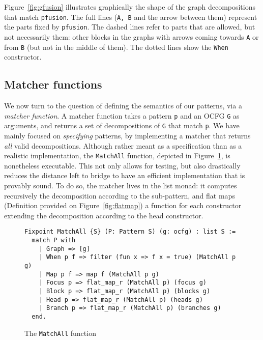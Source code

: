 \documentclass[11pt]{article}
\newcommand{\inlinecoq}[1]{\mbox{\lstinline[style=customcoq,columns=fixed,basewidth=.48em]{#1}}}
\newcommand{\ilc}[1]{\inlinecoq{#1}}
\newcommand{\yz}[1]{\textcolor{ForestGreen}{#1}}
\newcommand{\ocfg}{OCFG\xspace}
\begin{document}
Figure~\ref{fig:gfusion} illustrates graphically the shape of the graph decompositions that match \ilc{pfusion}. The full lines (\ilc{A, B} and the arrow between them) represent the parts fixed by \ilc{pfusion}. The dashed lines refer to parts that are allowed, but not necessarily them: other blocks in the graphs with arrows coming towards \ilc{A} or from \ilc{B} (but not in the middle of them). The dotted lines 
show the \ilc{When} constructor.

\subsection{Matcher functions}
\label{sec:matcher}

We now turn to the question of defining the semantics of our patterns, via a \emph{matcher function}. 
A matcher function takes a pattern \ilc{p} and an \ocfg{} \ilc{G} as arguments, and returns a set of decompositions of \ilc{G} that match \ilc{p}.
We have mainly focused on \emph{specifying} patterns, by implementing a matcher that returns \emph{all} valid decompositions. 
Although rather meant as a specification than as a realistic implementation, the \ilc{MatchAll} function, depicted in Figure~\ref{fig:matchall}, is nonetheless executable. This not only allows for testing, but also drastically reduces the distance left to bridge to have an efficient implementation that is provably sound. To do so, the matcher lives in the list monad: it computes recursively the decomposition according to the sub-pattern, and flat maps (Definition provided on Figure~\ref{fig:flatmap}) a function for each constructor extending the decomposition according to the head constructor.

\begin{figure}
  \label{fig:match}
  \begin{lstlisting}[style=customcoq,basicstyle=\small\ttfamily]
Fixpoint MatchAll {S} (P: Pattern S) (g: ocfg) : list S :=
  match P with
    | Graph => [g]
    | When p f => filter (fun x => f x = true) (MatchAll p g) 
    | Map p f => map f (MatchAll p g)
    | Focus p => flat_map_r (MatchAll p) (focus g)
    | Block p => flat_map_r (MatchAll p) (blocks g)
    | Head p => flat_map_r (MatchAll p) (heads g)
    | Branch p => flat_map_r (MatchAll p) (branches g)
  end.
  \end{lstlisting}
  \caption{The \ilc{MatchAll} function}
  \label{fig:matchall}
\end{figure}
\end{document}
